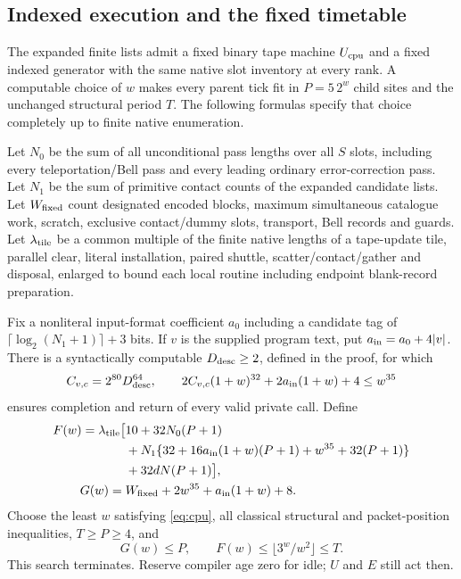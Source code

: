 \subsection{Indexed execution and the fixed timetable}
\begin{samepage}
\begin{lemma}\label{lem:timetable}
The expanded finite lists admit a fixed binary tape machine $U_{\rm cpu}$ and a fixed indexed generator with the same native slot inventory at every rank. A computable choice of $w$ makes every parent tick fit in $P=5\,2^w$ child sites and the unchanged structural period $T$. The following formulas specify that choice completely up to finite native enumeration.

Let $N_0$ be the sum of all unconditional pass lengths over all $S$ slots, including every teleportation/Bell pass and every leading ordinary error-correction pass. Let $N_1$ be the sum of primitive contact counts of the expanded candidate lists. Let $W_{\rm fixed}$ count designated encoded blocks, maximum simultaneous catalogue work, scratch, exclusive contact/dummy slots, transport, Bell records and guards. Let $\lambda_{\rm tile}$ be a common multiple of the finite native lengths of a tape-update tile, parallel clear, literal installation, paired shuttle, scatter/contact/gather and disposal, enlarged to bound each local routine including endpoint blank-record preparation.

Fix a nonliteral input-format coefficient $a_0$ including a candidate tag of $\lceil\log_2(N_1+1)\rceil+3$ bits. If $v$ is the supplied program text, put $a_{\rm in}=a_0+4|v|$. There is a syntactically computable $D_{\rm desc}\ge2$, defined in the proof, for which
\begin{equation}\label{eq:cpu}
 C_{v,c}=2^{80}D_{\rm desc}^{64},\qquad
 2C_{v,c}(1+w)^{32}+2a_{\rm in}(1+w)+4\le w^{35}
\end{equation}
ensures completion and return of every valid private call. Define
\begin{equation}\label{eq:timetable}
\begin{aligned}
 F(w)=\lambda_{\rm tile}\bigl[&10+32N_0(P+1)\\
 &+N_1\{32+16a_{\rm in}(1+w)(P+1)+w^{35}+32(P+1)\}\\
 &+32dN(P+1)\bigr],\\
 G(w)={}&W_{\rm fixed}+2w^{35}+a_{\rm in}(1+w)+8.
\end{aligned}
\end{equation}
Choose the least $w$ satisfying \eqref{eq:cpu}, all classical structural and packet-position inequalities, $T\ge P\ge4$, and
\begin{equation}\label{eq:fit}
 G(w)\le P,\qquad F(w)\le\lfloor3^w/w^2\rfloor\le T.
\end{equation}
This search terminates. Reserve compiler age zero for idle; $U$ and $E$ still act then.
\end{lemma}
\end{samepage}
